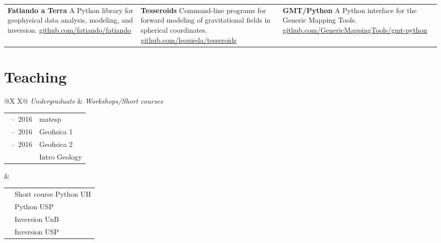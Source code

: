 \documentclass[11pt, a4paper]{article}
\newcommand{\TablePad}{\vspace{-0.4cm}}
\newcommand{\SoftwareTitle}[1]{{\fontsize{13pt}{0}\selectfont \bfseries #1}}
\newcommand{\TableTitle}[1]{{\fontsize{14pt}{0}\selectfont \itshape #1}}
\newcommand{\Duration}[2]{\fontsize{10pt}{0}\selectfont #1\ --\ #2}
\newcommand{\Year}[1]{\fontsize{10pt}{0}\selectfont #1}
\begin{document}
\TablePad
\begin{tabularx}{\textwidth}{@{}X X X@{}}
    \SoftwareTitle{Fatiando a Terra}
    \newline
    A Python library for geophysical data analysis, modeling, and
    inversion.
    \newline
    \href{https://github.com/fatiando/fatiando}{github.com/fatiando/fatiando}
    &
    \SoftwareTitle{Tesseroids}
    \newline
    Command-line programs for forward modeling of gravitational fields in
    spherical coordinates.
    \newline
    \href{https://github.com/leouieda/tesseroids}{github.com/leouieda/tesseroids}
    &
    \SoftwareTitle{GMT/Python}
    \newline
    A Python interface for the Generic Mapping Tools.
    \newline
    \href{https://github.com/GenericMappingTools/gmt-python}{github.com/GenericMappingTools/\newline gmt-python}
\end{tabularx}


\section*{Teaching}

\TablePad
\begin{tabularx}{\textwidth}{@{}X X@{}}
    \TableTitle{Undergraduate} & \TableTitle{Workshops/Short courses}
    \\[0.1cm]
    \begin{tabular}{@{}l l}
        \Duration{2014}{2016}  &
         matesp
        \hspace{10cm}
        \\
        \Duration{2014}{2016}  &
         Geofisica 1
        \\
        \Duration{2014}{2016}  &
         Geofisica 2
        \\
        \Year{2015}  &
         Intro Geology
    \end{tabular}
    &
    \begin{tabular}{@{}l l}
        \Year{2017}  &
        Short course Python UH
        \\
        \Year{2016}  &
        Python USP
        \\
        \Year{2014}  &
        Inversion UnB
        \\
        \Year{2011}  &
        Inversion USP
    \end{tabular}
\end{tabularx}
\end{document}
